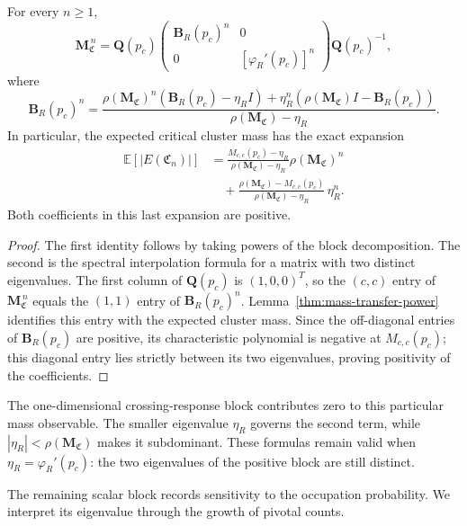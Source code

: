 \begin{corollary}\label{cor:SP-closed-form}\label{cor:mass-spectral-expansion}
For every $n\ge1$,
\[
 \mathbf M_{\mathfrak C}^{\,n}
 =\mathbf Q(p_c)
 \begin{pmatrix}
 \mathbf B_R(p_c)^n&0\\
 0&[\varphi_R'(p_c)]^n
 \end{pmatrix}
 \mathbf Q(p_c)^{-1},
\]
where
\[
 \mathbf B_R(p_c)^n
 =\frac{\rho(\mathbf M_{\mathfrak C})^n
       (\mathbf B_R(p_c)-\eta_R I)
       +\eta_R^n(\rho(\mathbf M_{\mathfrak C})I-\mathbf B_R(p_c))}
       {\rho(\mathbf M_{\mathfrak C})-\eta_R}.
\]
In particular, the expected critical cluster mass has the exact expansion
\begin{align*}
 \mathbb E[|E(\mathfrak C_n)|]
 &=\frac{M_{c,c}(p_c)-\eta_R}{\rho(\mathbf M_{\mathfrak C})-\eta_R}
       \rho(\mathbf M_{\mathfrak C})^n\\
 &\quad+\frac{\rho(\mathbf M_{\mathfrak C})-M_{c,c}(p_c)}
       {\rho(\mathbf M_{\mathfrak C})-\eta_R}\,\eta_R^n.
\end{align*}
Both coefficients in this last expansion are positive.
\end{corollary}
\begin{proof}
The first identity follows by taking powers of the block decomposition.
The second is the spectral interpolation formula for a matrix with two distinct eigenvalues.
The first column of $\mathbf Q(p_c)$ is $(1,0,0)^T$, so the $(c,c)$ entry of $\mathbf M_{\mathfrak C}^{\,n}$ equals the $(1,1)$ entry of $\mathbf B_R(p_c)^n$.
Lemma~\ref{thm:mass-transfer-power} identifies this entry with the expected cluster mass.
Since the off-diagonal entries of $\mathbf B_R(p_c)$ are positive, its characteristic polynomial is negative at $M_{c,c}(p_c)$; this diagonal entry lies strictly between its two eigenvalues, proving positivity of the coefficients.
\end{proof}

The one-dimensional crossing-response block contributes zero to this particular mass observable.
The smaller eigenvalue $\eta_R$ governs the second term, while $|\eta_R|<\rho(\mathbf M_{\mathfrak C})$ makes it subdominant.
These formulas remain valid when $\eta_R=\varphi_R'(p_c)$: the two eigenvalues of the positive block are still distinct.

The remaining scalar block records sensitivity to the occupation probability.
We interpret its eigenvalue through the growth of pivotal counts.


